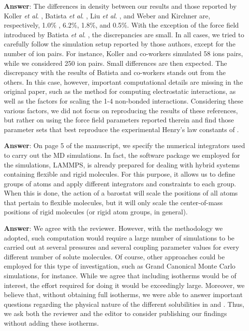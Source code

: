 \documentclass[]{article}
\begin{document}
\textbf{Answer}: The differences in density between our results and those reported by Koller \textit{et al}. \cite{Koller_2012}, Batista \textit{et al}. \cite{Batista_2015}, Liu \textit{et al}. \cite{Liu_2014}, and Weber and Kirchner \cite{Weber_2016} are, respectively, 1.0\% , 6.2\%, 1.8\%, and 0.5\%.
With the exception of the force field introduced by Batista \textit{et al}. \cite{Batista_2015}, the discrepancies are small.
In all cases, we tried to carefully follow the simulation setup reported by those authors, except for the number of ion pairs.
For instance, Koller and co-workers \cite{Koller_2012} simulated 58 ions pairs, while we considered 250 ion pairs.
Small differences are then expected.
The discrepancy with the results of Batista and co-workers \cite{Batista_2015} stands out from the others.
In this case, however, important computational details are missing in the original paper, such as the method for computing electrostatic interactions, as well as the factors for scaling the 1-4 non-bonded interactions. 
Considering these various factors, we did not focus on reproducing the results of these references, but rather on using the force field parameters reported therein and find those parameter sets that best reproduce the experimental Henry's law constants of .

{\color{blue}{4) Simulating hybrid systems that include both rigid and non rigid bodies is complex and tricky. The authors should describe in detail how they performed these simulations in terms of barostatting and thermostatting.}}

\textbf{Answer}: On page 5 of the manuscript, we specify the numerical integrators used to carry out the MD simulations.
In fact, the software package we employed for the simulations, LAMMPS, is already prepared for dealing with hybrid systems containing flexible and rigid molecules.
For this purpose, it allows us to define groups of atoms and apply different integrators and constraints to each group.
When this is done, the action of a barostat will scale the positions of all atoms that pertain to flexible molecules, but it will only scale the center-of-mass positions of rigid molecules (or rigid atom groups, in general).

{\color{blue}{5) It would be interesting if at least for the case of CO2 an isotherm was calculated and included in the paper.}}

\textbf{Answer}: We agree with the reviewer.
However, with the methodology we adopted, such computation would require a large number of simulations to be carried out at several pressures and several coupling parameter values for every different number of solute molecules.
Of course, other approaches could be employed for this type of investigation, such as Grand Canonical Monte Carlo simulations, for instance.
While we agree that including isotherms would be of interest, the effort required for doing it would be exceedingly large.
Moreover, we believe that, without obtaining full isotherms, we were able to answer important questions regarding the physical nature of the different  solubilities in \ce{[emim][B(CN)_4]} and \ce{[emim][NTF_2]}.
Thus, we ask both the reviewer and the editor to consider publishing our findings without adding these isotherms.
\end{document}
